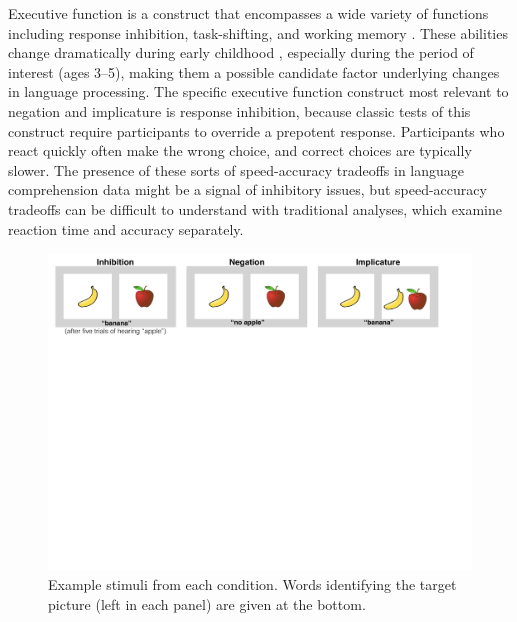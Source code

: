 \documentclass[10pt,letterpaper]{article}
\begin{document}
Executive function is a construct that encompasses a wide variety of functions including response inhibition, task-shifting, and working memory \cite{miyake2000}. These abilities change dramatically during early childhood \cite{diamond1996,davidson2006}, especially during the period of interest (ages 3--5), making them a possible candidate factor underlying changes in language processing. The specific executive function construct most relevant to negation and implicature is response inhibition, because classic tests of this construct require participants to override a prepotent response. Participants who react quickly often make the wrong choice, and correct choices are typically slower. The presence of these sorts of speed-accuracy tradeoffs in language comprehension data might be a signal of inhibitory issues, but speed-accuracy tradeoffs can be difficult to understand with traditional analyses, which examine reaction time and accuracy separately.


\begin{figure}[t!]
\begin{centering}
\includegraphics[width=\textwidth]{figures/stimuli.pdf}
\caption{\label{fig:stimuli} Example stimuli from each condition. Words identifying the target picture (left in each panel) are given at the bottom.}
\end{centering}
\end{figure}
\end{document}
